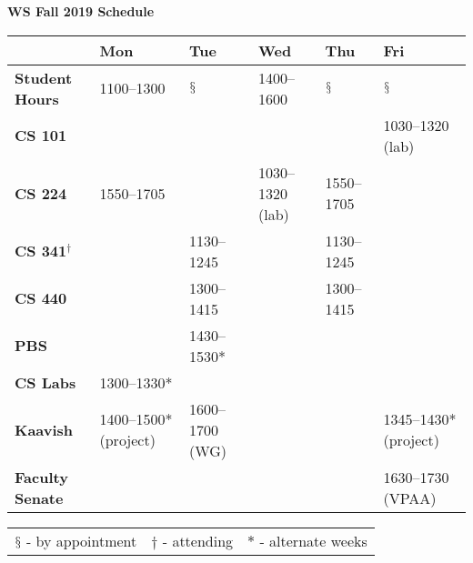 \documentclass[landscape]{article}
\begin{document}
\thispagestyle{empty}

\pagebreak
\hspace{0pt}
\vfill
\centerline{ \Huge \textbf{WS Fall 2019 Schedule}  }
\bigskip

\Large


\begin{tabularx}{\textwidth}{|>{\bfseries}X||*{5}{X|}}
  \hline
  & \textbf{Mon} & \textbf{Tue} & \textbf{Wed} & \textbf{Thu} & \textbf{Fri}\\\hline\hline
  Student Hours & 1100--1300 & $\mathsection$ & 1400--1600 & $\mathsection$ & $\mathsection$ \\\hline\hline
  CS 101 & & & & & 1030--1320 (lab) \\\hline
  CS 224 & 1550--1705 & & 1030--1320 (lab) & 1550--1705 &  \\\hline
  CS 341$^\dagger$ & & 1130--1245 & & 1130--1245  &  \\\hline
  CS 440 & & 1300--1415 & & 1300--1415  &  \\\hline\hline
  PBS & & 1430--1530* & & &   \\\hline
  CS Labs & 1300--1330*& & & &  \\\hline
  Kaavish & 1400--1500* (project) & 1600--1700 (WG) & & & 1345--1430* (project)\\\hline
  Faculty Senate & & & & & 1630--1730  (VPAA) \\\hline
\end{tabularx}
\normalsize
\bigskip
\begin{tabularx}{\textwidth}{*{3}{X}}
  $\mathsection$ - by appointment &
  $\dagger$ - attending &
  $*$ - alternate weeks 
\end{tabularx}
\vfill
\hspace{0pt}
\pagebreak
\end{document}
